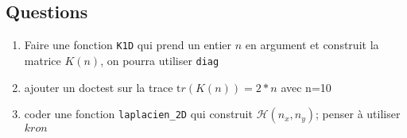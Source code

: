 \documentclass[11pt,a4wide]{article}
\begin{document}
   \subsection{Questions}
     
      \begin{enumerate}

        \item Faire une fonction {\tt K1D} qui prend un entier $n$ en argument et construit la matrice $K(n)$, on pourra utiliser {\tt diag}
	\item ajouter un doctest sur la trace ${\mathrm tr}(K(n))=2*n$ avec n=10
	\item coder une fonction {\tt laplacien\_2D} qui construit ${\mathcal H}(n_x,n_y)$; penser à utiliser $kron$
                 
     \end{enumerate}
\end{document}

